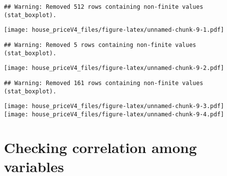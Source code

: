 \documentclass[
]{article}
\newenvironment{Shaded}{\begin{snugshade}}{\end{snugshade}}
\newcommand{\DataTypeTok}[1]{\textcolor[rgb]{0.13,0.29,0.53}{#1}}
\newcommand{\DecValTok}[1]{\textcolor[rgb]{0.00,0.00,0.81}{#1}}
\newcommand{\KeywordTok}[1]{\textcolor[rgb]{0.13,0.29,0.53}{\textbf{#1}}}
\newcommand{\NormalTok}[1]{#1}
\newcommand{\OperatorTok}[1]{\textcolor[rgb]{0.81,0.36,0.00}{\textbf{#1}}}
\newcommand{\StringTok}[1]{\textcolor[rgb]{0.31,0.60,0.02}{#1}}
\begin{document}
\begin{Shaded}
\end{Shaded}

\begin{verbatim}
## Warning: Removed 512 rows containing non-finite values (stat_boxplot).
\end{verbatim}

\texttt{[image: house\_priceV4\_files/figure-latex/unnamed-chunk-9-1.pdf]}

\begin{verbatim}
## Warning: Removed 5 rows containing non-finite values (stat_boxplot).
\end{verbatim}

\texttt{[image: house\_priceV4\_files/figure-latex/unnamed-chunk-9-2.pdf]}

\begin{verbatim}
## Warning: Removed 161 rows containing non-finite values (stat_boxplot).
\end{verbatim}

\texttt{[image: house\_priceV4\_files/figure-latex/unnamed-chunk-9-3.pdf]}
\texttt{[image: house\_priceV4\_files/figure-latex/unnamed-chunk-9-4.pdf]}

\hypertarget{checking-correlation-among-variables}{%
\section{Checking correlation among
variables}\label{checking-correlation-among-variables}}

\begin{Shaded}
\end{Shaded}
\end{document}
